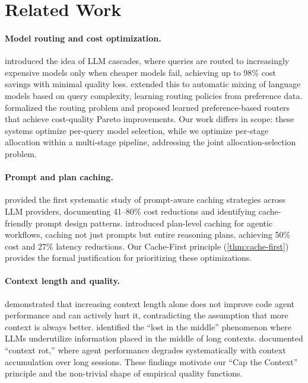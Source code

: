 \documentclass[11pt, a4paper, logo, copyright]{googledeepmind}
\begin{document}
\section{Related Work}\label{sec:related}

\paragraph{Model routing and cost optimization.}
\citet{chen2023frugalgpt} introduced the idea of LLM cascades, where queries are routed to increasingly expensive models only when cheaper models fail, achieving up to 98\% cost savings with minimal quality loss. \citet{madaan2024automix} extended this to automatic mixing of language models based on query complexity, learning routing policies from preference data. \citet{ong2024routellm} formalized the routing problem and proposed learned preference-based routers that achieve cost-quality Pareto improvements. Our work differs in scope: these systems optimize per-query model selection, while we optimize per-stage allocation within a multi-stage pipeline, addressing the joint allocation-selection problem.

\paragraph{Prompt and plan caching.}
\citet{liang2026cache} provided the first systematic study of prompt-aware caching strategies across LLM providers, documenting 41--80\% cost reductions and identifying cache-friendly prompt design patterns. \citet{zhang2025plancache} introduced plan-level caching for agentic workflows, caching not just prompts but entire reasoning plans, achieving 50\% cost and 27\% latency reductions. Our Cache-First principle (\cref{thm:cache-first}) provides the formal justification for prioritizing these optimizations.

\paragraph{Context length and quality.}
\citet{gao2025context} demonstrated that increasing context length alone does not improve code agent performance and can actively hurt it, contradicting the assumption that more context is always better. \citet{liu2024lost} identified the ``lost in the middle'' phenomenon where LLMs underutilize information placed in the middle of long contexts. \citet{chroma2025rot} documented ``context rot,'' where agent performance degrades systematically with context accumulation over long sessions. These findings motivate our ``Cap the Context'' principle and the non-trivial shape of empirical quality functions.
\end{document}

